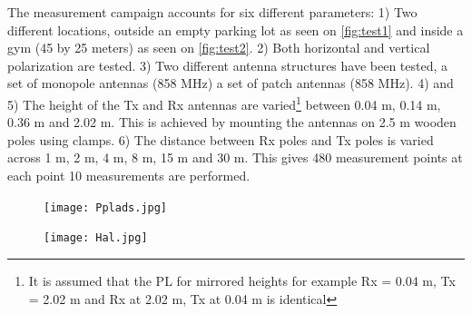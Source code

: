 The measurement campaign accounts for six different parameters: 1) Two different locations, outside an empty parking lot as seen on \autoref{fig:test1} and inside a gym (45 by 25 meters) as seen on \autoref{fig:test2}. 2) Both horizontal and vertical polarization are tested. 3) Two different antenna structures have been tested, a set of monopole antennas (858 MHz) a set of patch antennas (858 MHz). 4) and 5) The height of the Tx and Rx antennas are varied\footnote{It is assumed that the PL for mirrored heights for example Rx = 0.04 m, Tx = 2.02 m and Rx at 2.02 m, Tx at 0.04 m is identical} between 0.04 m, 0.14 m, 0.36 m and 2.02 m. This is achieved by mounting the antennas on 2.5 m wooden poles using clamps. 6) The distance between Rx poles and Tx poles is varied across 1 m, 2 m, 4 m, 8 m, 15 m and 30 m. This gives 480 measurement points at each point 10 measurements are performed.












\begin{figure}[H]
\centering
\begin{minipage}{.23\textwidth}
  \centering
  \texttt{[image: Pplads.jpg]}
  \label{fig:test1}
\end{minipage}%
\hspace{2mm}
\begin{minipage}{.23\textwidth}
  \centering
  \texttt{[image: Hal.jpg]}
  \label{fig:test2}
\end{minipage}
\end{figure}

